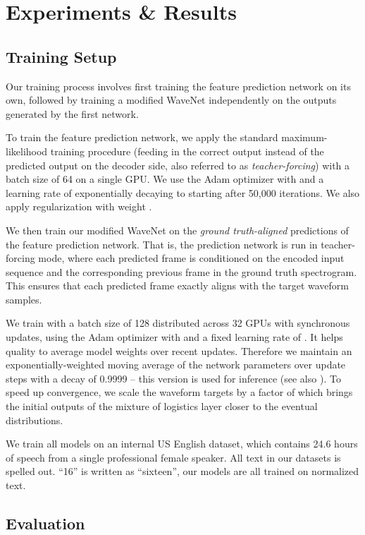 \section{Experiments \& Results}
\label{sec:experiments}

\subsection{Training Setup}
Our training process involves first training the feature prediction network
on its own, followed by training a modified WaveNet independently on the outputs
generated by the first network.

To train the feature prediction network, we apply the standard
maximum-likelihood training procedure (feeding in the
correct output instead of the predicted output on the decoder side, also
referred to as {\em teacher-forcing})
with a batch size of 64 on a single GPU. We use the Adam optimizer
\cite{DBLP:journals/corr/KingmaB14} with
 and a learning rate of
 exponentially decaying to  starting after 50,000 iterations.
We also apply  regularization with weight .

We then train our modified WaveNet on the \emph{ground truth-aligned}
predictions of the feature prediction network.
That is, the prediction network is run in teacher-forcing mode,
where each predicted frame is conditioned on the encoded input sequence and the
corresponding previous frame in the ground truth spectrogram. This ensures that
each predicted frame exactly aligns with the target waveform samples.

We train with a batch size of 128 distributed across 32 GPUs
with synchronous updates, using the Adam optimizer with
 and a fixed learning rate of
. It helps quality to average model weights over recent updates.  Therefore
we maintain an exponentially-weighted moving average of the network parameters
over update steps with a decay of 0.9999 -- this version is used for inference
(see also \cite{DBLP:journals/corr/KingmaB14}).
To speed up convergence, we scale the waveform targets by a factor of 
which brings the initial outputs of the mixture of logistics layer closer to
the eventual distributions.

We train all models on an internal US English dataset\cite{46150}, which
contains 24.6 hours of speech from a single professional female speaker.
All text in our datasets is spelled out. \eg ``16'' is written as ``sixteen'',
\ie our models are all trained on normalized text.

\subsection{Evaluation}

